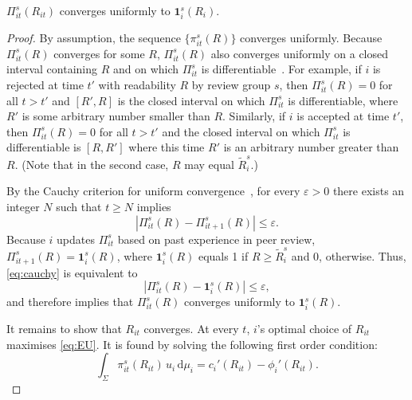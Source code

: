 \begin{lemma}
	$\Pi_{it}^s(R_{it})$ converges uniformly to $\bm1_i^s(R_i)$.
	\label{lemma2}
\end{lemma}

\begin{proof}	
	By assumption, the sequence $\{\pi_{it}^{s}(R)\}$ converges uniformly. Because $\Pi_{it}^{s}(R)$ converges for some $R$, $\Pi_{it}^{s}(R)$ also converges uniformly on a closed interval containing $R$ and on which $\Pi_{it}^s$ is differentiable~\citep[Theorem 7.17]{Rudin1976}. For example, if $i$ is rejected at time $t'$ with readability $R$ by review group $s$, then $\Pi_{it}^{s}(R)=0$ for all $t>t'$ and $[R',R]$  is the closed interval on which $\Pi_{it}^s$ is differentiable, where $R'$ is some arbitrary number smaller than $R$. Similarly, if $i$ is accepted at time $t'$, then $\Pi_{it}^s(R)=0$ for all $t>t'$ and the closed interval on which $\Pi_{it}^s$ is differentiable is $[R,R']$ where this time $R'$ is an arbitrary number greater than $R$. (Note that in the second case, $R$ may equal $\widetilde R_i^s$.)
	
	
	By the Cauchy criterion for uniform convergence~\citep[Theorem 7.8]{Rudin1976}, for every $\varepsilon>0$ there exists an integer $N$ such that $t\ge N$ implies
	\begin{equation}
		\left|\Pi_{it}^{s}(R)-\Pi_{it+1}^{s}(R)\right|\le\varepsilon.
		\label{eq:cauchy}
	\end{equation}
	Because $i$ updates $\Pi_{it}^{s}$ based on past experience in peer review, $\Pi_{it+1}^{s}(R)=\bm1_i^{s}(R)$, where $\bm1_i^{s}(R)$ equals 1 if $R\ge\widetilde R_{i}^s$ and 0, otherwise. Thus, \autoref{eq:cauchy} is equivalent to
	\begin{equation*}
		\left|\Pi_{it}^{s}(R)-\bm1_i^s(R)\right|\le\varepsilon,
		\label{eq:cauchy0}
	\end{equation*}
	and therefore implies that $\Pi_{it}^{s}(R)$ converges uniformly to $\bm1_i^{s}(R)$.
	
	It remains to show that $R_{it}$ converges. At every $t$, $i$'s optimal choice of $R_{it}$ maximises \autoref{eq:EU}. It is found by solving the following first order condition:
	\begin{equation}
		\int_\Sigma\!\pi_{it}^{s}(R_{it})\,u_i\,\mathrm d\mu_i=c_i'(R_{it})-\phi_i'(R_{it}).
		\label{eq:foc0}
	\end{equation}
	

\end{proof}
